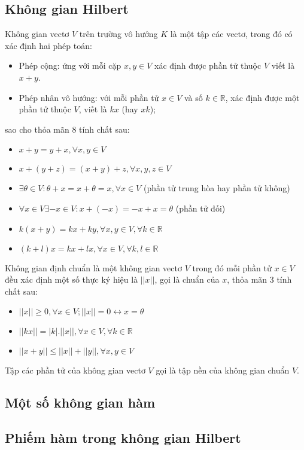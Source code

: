 \subsection{Không gian Hilbert}
\begin{defi}
Không gian vectơ $V$ trên trường vô hướng $K$ là một tập các vectơ, trong đó có xác định hai phép toán:
\begin{itemize}
\item Phép cộng: ứng với mỗi cặp $x, y \in V$ xác định được phần tử thuộc $V$ viết là $x+y$.
\item Phép nhân vô hướng: với mỗi phần tử $x \in V$ và số $k \in \mathbb{R}$, xác định được một phần tử thuộc $V$, viết là $kx$ (hay $xk$);
\end{itemize}
sao cho thỏa mãn 8 tính chất sau:
\begin{itemize}
\item $x+y=y+x, \forall x,y\in V$
\item $x+(y+z)=(x+y)+z, \forall x,y,z\in V$
\item $\exists \theta \in V: \theta +x=x+\theta =x, \forall x\in V$ (phần tử trung hòa hay phần tử không)
\item $\forall x\in V \exists -x \in V : x + (-x) = -x + x=\theta$ (phần tử đối)
\item $k(x+y) = kx+ky, \forall x,y\in V, \forall k\in\mathbb{R}$
\item $(k+l)x = kx + lx, \forall x\in V, \forall k,l\in\mathbb{R}$
\end{itemize}
\end{defi}
\begin{defi}
Không gian định chuẩn là một không gian vectơ $V$ trong đó mỗi phần tử $x\in V$ đều xác định một số thực ký hiệu là $||x||$, gọi là chuẩn của $x$, thỏa mãn 3 tính chất sau:
\begin{itemize}
\item $||x|| \geq 0, \forall x\in V;||x|| = 0 \leftrightarrow x=\theta$
\item $||kx||=|k|.||x||,\forall x\in V, \forall k\in \mathbb{R}$
\item $||x+y||\leq ||x||+||y||,\forall x,y \in V$
\end{itemize}
\end{defi}
Tập các phần tử của không gian vectơ $V$ gọi là tập nền của không gian chuẩn $V$.
\subsection{Một số không gian hàm}
\subsection{Phiếm hàm trong không gian Hilbert}
